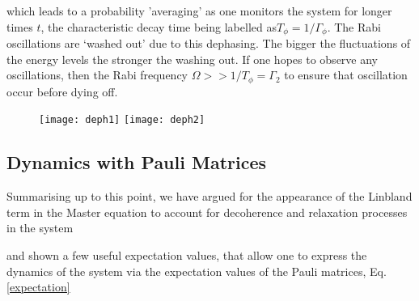   \noindent which  leads to a  probability 'averaging' as  one monitors
  the system  for longer  times $  t $,  the characteristic  decay time
  being labelled as$ T_\phi =1/\Gamma_\phi $. The Rabi oscillations are
  `washed out'  due to this  dephasing. The bigger the  fluctuations of
  the  energy levels  the stronger  the washing  out. If  one hopes  to
  observe    any     oscillations,    then    the     Rabi    frequency
  $  \Omega>>1/T_\phi =  \Gamma_2 $  to ensure  that oscillation  occur
  before dying off.

  \begin{figure}
    \texttt{[image: deph1]}
    \texttt{[image: deph2]}
  \end{figure}

  \newpage

 \subsection{Dynamics with Pauli Matrices\label{subsec:dynamics_with_pauli}}
 Summarising up to this point, we have argued for the appearance of the
 Linbland term  in the Master  equation to account for  decoherence and
 relaxation          processes          in          the          system

 \noindent and shown a few useful expectation values, that allow one to
 express the dynamics  of the system via the expectation  values of the
 Pauli matrices, Eq.\eqref{expectation}


